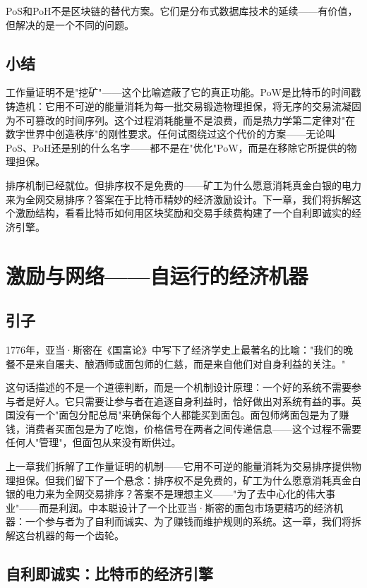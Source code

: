 \documentclass[a4paper,12pt,openany]{ctexbook}
\begin{document}
PoS和PoH不是区块链的替代方案。它们是分布式数据库技术的延续——有价值，但解决的是一个不同的问题。


\section*{小结}


工作量证明不是"挖矿"——这个比喻遮蔽了它的真正功能。PoW是比特币的时间戳铸造机：它用不可逆的能量消耗为每一批交易锻造物理担保，将无序的交易流凝固为不可篡改的时间序列。这个过程消耗能量不是浪费，而是热力学第二定律对"在数字世界中创造秩序"的刚性要求。任何试图绕过这个代价的方案——无论叫PoS、PoH还是别的什么名字——都不是在"优化"PoW，而是在移除它所提供的物理担保。

排序机制已经就位。但排序权不是免费的——矿工为什么愿意消耗真金白银的电力来为全网交易排序？答案在于比特币精妙的经济激励设计。下一章，我们将拆解这个激励结构，看看比特币如何用区块奖励和交易手续费构建了一个自利即诚实的经济引擎。



\chapter{激励与网络——自运行的经济机器}



\section*{引子}


1776年，亚当·斯密在《国富论》中写下了经济学史上最著名的比喻："我们的晚餐不是来自屠夫、酿酒师或面包师的仁慈，而是来自他们对自身利益的关注。"

这句话描述的不是一个道德判断，而是一个机制设计原理：一个好的系统不需要参与者是好人。它只需要让参与者在追逐自身利益时，恰好做出对系统有益的事。英国没有一个"面包分配总局"来确保每个人都能买到面包。面包师烤面包是为了赚钱，消费者买面包是为了吃饱，价格信号在两者之间传递信息——这个过程不需要任何人"管理"，但面包从来没有断供过。

上一章我们拆解了工作量证明的机制——它用不可逆的能量消耗为交易排序提供物理担保。但我们留下了一个悬念：排序权不是免费的，矿工为什么愿意消耗真金白银的电力来为全网交易排序？答案不是理想主义——"为了去中心化的伟大事业"——而是利润。中本聪设计了一个比亚当·斯密的面包市场更精巧的经济机器：一个参与者为了自利而诚实、为了赚钱而维护规则的系统。这一章，我们将拆解这台机器的每一个齿轮。


\section*{自利即诚实：比特币的经济引擎}
\end{document}
